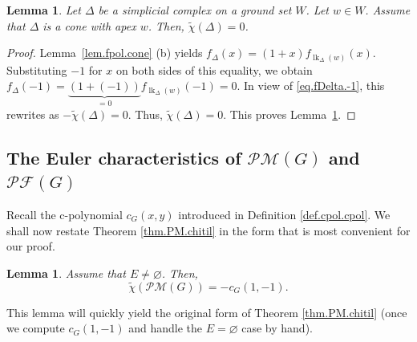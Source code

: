 \documentclass[12pt]{amsart}
\newtheorem{lemma}[theorem]{Lemma}
\theoremstyle{definition}
\DeclareMathOperator{\lk}{lk}
\newcommand{\tup}[1]{\left( #1 \right)}
\newcommand{\chitil}{\widetilde{\chi}}
\newcommand{\Pm}[1]{\mathcal{PM}\left(#1\right)}
\newcommand{\Pf}[1]{\mathcal{PF}\left(#1\right)}
\begin{document}
\begin{lemma} \label{lem.chitil.cone}
Let $\Delta$ be a simplicial complex on a ground set $W$. Let $w \in W$. Assume that $\Delta$ is a cone with apex $w$.
Then, $\chitil\tup{\Delta} = 0$.
\end{lemma}

\begin{proof}
Lemma~\ref{lem.fpol.cone} (b) yields
$f_{\Delta}\tup{x} = \tup{1+x} f_{\lk_\Delta(w)}\tup{x}$.
Substituting $-1$ for $x$ on both sides of this equality, we obtain
$f_{\Delta}\tup{-1} = \underbrace{\tup{1+\tup{-1}}}_{=0} f_{\lk_\Delta(w)}\tup{-1} = 0$.
In view of \eqref{eq.fDelta.-1}, this rewrites as
$- \chitil\tup{\Delta} = 0$. Thus,
$\chitil\tup{\Delta} = 0$.
This proves Lemma~\ref{lem.chitil.cone}.
\end{proof}

\subsection{The Euler characteristics of $\Pm{G}$ and $\Pf{G}$}

Recall the c-polynomial $c_{G}\left(  x,y\right)  $ introduced in Definition
\ref{def.cpol.cpol}. We shall now restate Theorem \ref{thm.PM.chitil} in the
form that is most convenient for our proof.

\begin{lemma}
\label{lem.PM.chitil-c}
Assume that $E \neq \varnothing$. Then,
\[
\widetilde{\chi}\left(  \Pm{G}\right)
= - c_G \left( 1,-1\right)  .
\]

\end{lemma}

This lemma will quickly yield the original form of Theorem \ref{thm.PM.chitil}
(once we compute $c_{G}\left(  1,-1\right)  $ and handle the $E=\varnothing$
case by hand).
\end{document}
